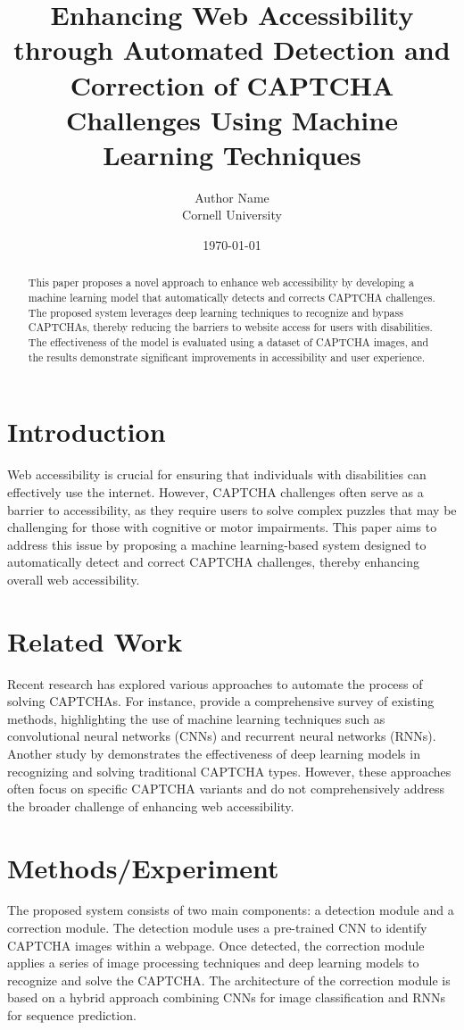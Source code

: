 \documentclass{article}
\title{Enhancing Web Accessibility through Automated Detection and Correction of CAPTCHA Challenges Using Machine Learning Techniques}
\author{Author Name \\ Cornell University}
\date{\today}
\begin{document}
\maketitle

\begin{abstract}
This paper proposes a novel approach to enhance web accessibility by developing a machine learning model that automatically detects and corrects CAPTCHA challenges. The proposed system leverages deep learning techniques to recognize and bypass CAPTCHAs, thereby reducing the barriers to website access for users with disabilities. The effectiveness of the model is evaluated using a dataset of CAPTCHA images, and the results demonstrate significant improvements in accessibility and user experience.
\end{abstract}

\section{Introduction}
Web accessibility is crucial for ensuring that individuals with disabilities can effectively use the internet. However, CAPTCHA challenges often serve as a barrier to accessibility, as they require users to solve complex puzzles that may be challenging for those with cognitive or motor impairments. This paper aims to address this issue by proposing a machine learning-based system designed to automatically detect and correct CAPTCHA challenges, thereby enhancing overall web accessibility.

\section{Related Work}
Recent research has explored various approaches to automate the process of solving CAPTCHAs. For instance, \cite{choudhury2019survey} provide a comprehensive survey of existing methods, highlighting the use of machine learning techniques such as convolutional neural networks (CNNs) and recurrent neural networks (RNNs). Another study by \cite{zhang2020deep} demonstrates the effectiveness of deep learning models in recognizing and solving traditional CAPTCHA types. However, these approaches often focus on specific CAPTCHA variants and do not comprehensively address the broader challenge of enhancing web accessibility.

\section{Methods/Experiment}
The proposed system consists of two main components: a detection module and a correction module. The detection module uses a pre-trained CNN to identify CAPTCHA images within a webpage. Once detected, the correction module applies a series of image processing techniques and deep learning models to recognize and solve the CAPTCHA. The architecture of the correction module is based on a hybrid approach combining CNNs for image classification and RNNs for sequence prediction.
\end{document}
